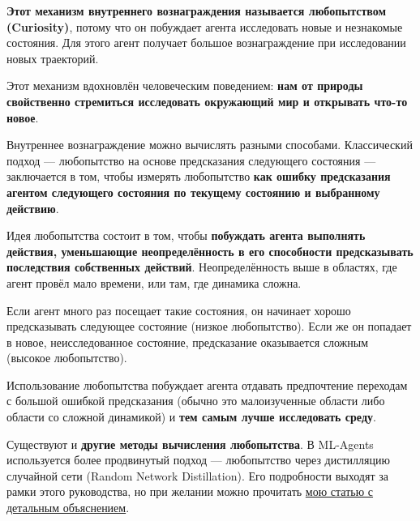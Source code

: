 \documentclass[11pt,a4paper]{article}
\begin{document}
\textbf{Этот механизм внутреннего вознаграждения называется любопытством (Curiosity)}, потому что он побуждает агента исследовать новые и незнакомые состояния. Для этого агент получает большое вознаграждение при исследовании новых траекторий.

Этот механизм вдохновлён человеческим поведением: \textbf{нам от природы свойственно стремиться исследовать окружающий мир и открывать что-то новое}.

Внутреннее вознаграждение можно вычислять разными способами. Классический подход --- любопытство на основе предсказания следующего состояния --- заключается в том, чтобы измерять любопытство \textbf{как ошибку предсказания агентом следующего состояния по текущему состоянию и выбранному действию}.


Идея любопытства состоит в том, чтобы \textbf{побуждать агента выполнять действия, уменьшающие неопределённость в его способности предсказывать последствия собственных действий}. Неопределённость выше в областях, где агент провёл мало времени, или там, где динамика сложна.

Если агент много раз посещает такие состояния, он начинает хорошо предсказывать следующее состояние (низкое любопытство). Если же он попадает в новое, неисследованное состояние, предсказание оказывается сложным (высокое любопытство).


Использование любопытства побуждает агента отдавать предпочтение переходам с большой ошибкой предсказания (обычно это малоизученные области либо области со сложной динамикой) и \textbf{тем самым лучше исследовать среду}.

Существуют и \textbf{другие методы вычисления любопытства}. В ML-Agents используется более продвинутый подход --- любопытство через дистилляцию случайной сети (Random Network Distillation). Его подробности выходят за рамки этого руководства, но при желании можно прочитать \href{https://medium.com/data-from-the-trenches/curiosity-driven-learning-through-random-network-distillation-488ffd8e5938}{мою статью с детальным объяснением}.
\end{document}
